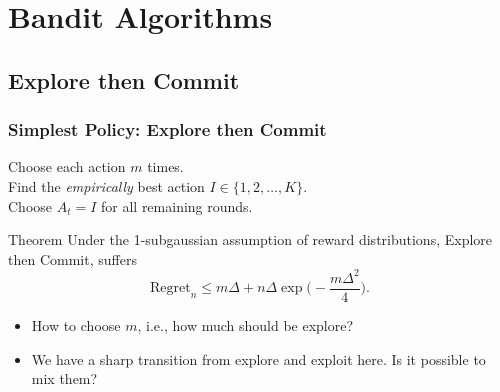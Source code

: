 \documentclass[usenames,dvipsnames, 10pt]{beamer}
\begin{document}
\section{Bandit Algorithms}

\subsection{Explore then Commit}
\begin{frame}
	\frametitle{Simplest Policy: Explore then Commit}
		\begin{algorithm*}[H]
			\SetAlgoLined
			Choose each action $m$ times.\\
			Find the \textit{empirically} best action $I\in\{1,2,\dots,K\}$.\\
			Choose $A_t=I$ for all remaining rounds.		
		\end{algorithm*}
	
		\vspace{0.3cm}
	
		\pause
	
		\begin{alertblock}{Theorem}
			Under the 1-subgaussian assumption of reward distributions, Explore then Commit, suffers
			\vspace{-0.3cm}
			\begin{equation*}
				\text{Regret}_n \leq m\Delta + n\Delta \exp\Big(-\frac{m\Delta^2}{4}\Big).
			\end{equation*}
			\vspace{-0.3cm}
		\end{alertblock}
		\begin{itemize}
			\item 		 How to choose $m$, i.e., how much should be explore?			
			\item We have a sharp transition from explore and exploit  here. Is it possible to mix them?
		\end{itemize}


	
\end{frame}
\end{document}
